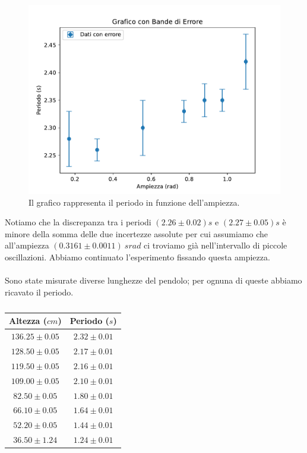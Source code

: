 \documentclass[11pt]{article}
\begin{document}
\begin{figure}[H]
  \centering
  \includegraphics[width=1\textwidth]{grafico1p1.pdf}
  \caption{Il grafico rappresenta il periodo in funzione dell'ampiezza.}
\end{figure}

Notiamo che la discrepanza tra i periodi $(2.26\pm 0.02) s$ e $(2.27\pm 0.05) s$ è minore della somma delle due incertezze assolute per cui assumiamo che all'ampiezza $(0.3161\pm 0.0011) \ srad$ ci troviamo già nell'intervallo di piccole oscillazioni. Abbiamo continuato l'esperimento fissando questa ampiezza.
\\ \\
Sono state misurate diverse lunghezze del pendolo; per ognuna di queste abbiamo ricavato il periodo.

\begin{table}[H]
\centering
\begin{tabular}{|c|c|}
\hline
\textbf{Altezza ($cm$)} & \textbf{Periodo ($s$)} \\
\hline
$136.25\pm 0.05$ & $2.32\pm 0.01$ \\
$128.50\pm 0.05$ & $2.17\pm 0.01$ \\
$119.50\pm 0.05$ & $2.16\pm 0.01$ \\
$109.00\pm 0.05$ & $2.10\pm 0.01$ \\
$82.50\pm 0.05$ & $1.80\pm 0.01$ \\
$66.10\pm 0.05$ & $1.64\pm 0.01$ \\
$52.20\pm 0.05$ & $1.44\pm 0.01$ \\
$36.50\pm 1.24$ & $1.24\pm 0.01$ \\
\hline
\end{tabular}
\caption{}
\label{tab:}
\end{table}
\end{document}
